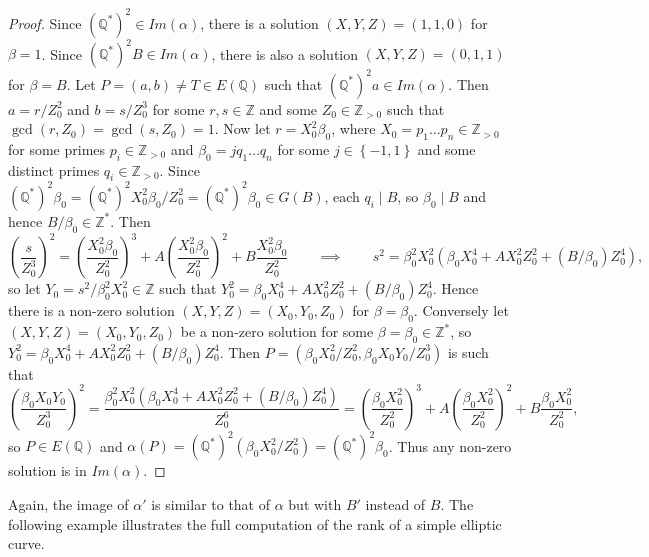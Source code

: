 \documentclass{article}
\newcommand{\Z}{\mathbb{Z}}
\newcommand{\Q}{\mathbb{Q}}
\newcommand{\rb}[1]{\left( #1 \right)}
\newcommand{\cb}[1]{\left\{ #1 \right\}}
\theoremstyle{definition}
\begin{document}
\begin{proof}
Since $ \rb{\Q^*}^2 \in Im\rb{\alpha} $, there is a solution $ \rb{X, Y, Z} = \rb{1, 1, 0} $ for $ \beta = 1 $. Since $ \rb{\Q^*}^2B \in Im\rb{\alpha} $, there is also a solution $ \rb{X, Y, Z} = \rb{0, 1, 1} $ for $ \beta = B $. Let $ P = \rb{a, b} \ne T \in E\rb{\Q} $ such that $ \rb{\Q^*}^2a \in Im\rb{\alpha} $. Then $ a = r / Z_0^2 $ and $ b = s / Z_0^3 $ for some $ r, s \in \Z $ and some $ Z_0 \in \Z_{> 0} $ such that $ \gcd\rb{r, Z_0} = \gcd\rb{s, Z_0} = 1 $. Now let $ r = X_0^2\beta_0 $, where $ X_0 = p_1 \dots p_n \in \Z_{> 0} $ for some primes $ p_i \in \Z_{> 0} $ and $ \beta_0 = j q_1 \dots q_n $ for some $ j \in \cb{-1, 1} $ and some distinct primes $ q_i \in \Z_{> 0} $. Since $ \rb{\Q^*}^2\beta_0 = \rb{\Q^*}^2X_0^2\beta_0 / Z_0^2 = \rb{\Q^*}^2\beta_0 \in G\rb{B} $, each $ q_i \mid B $, so $ \beta_0 \mid B $ and hence $ B / \beta_0 \in \Z^* $. Then
$$ \rb{\dfrac{s}{Z_0^3}}^2 = \rb{\dfrac{X_0^2\beta_0}{Z_0^2}}^3 + A\rb{\dfrac{X_0^2\beta_0}{Z_0^2}}^2 + B\dfrac{X_0^2\beta_0}{Z_0^2} \qquad \implies \qquad s^2 = \beta_0^2X_0^2\rb{\beta_0X_0^4 + AX_0^2Z_0^2 + \rb{B / \beta_0}Z_0^4}, $$
so let $ Y_0 = s^2 / \beta_0^2X_0^2 \in \Z $ such that $ Y_0^2 = \beta_0X_0^4 + AX_0^2Z_0^2 + \rb{B / \beta_0}Z_0^4 $. Hence there is a non-zero solution $ \rb{X, Y, Z} = \rb{X_0, Y_0, Z_0} $ for $ \beta = \beta_0 $. Conversely let $ \rb{X, Y, Z} = \rb{X_0, Y_0, Z_0} $ be a non-zero solution for some $ \beta = \beta_0 \in \Z^* $, so $ Y_0^2 = \beta_0 X_0^4 + AX_0^2Z_0^2 + \rb{B / \beta_0}Z_0^4 $. Then $ P = \rb{\beta_0 X_0^2 / Z_0^2, \beta_0 X_0Y_0 / Z_0^3} $ is such that
$$ \rb{\dfrac{\beta_0 X_0Y_0}{Z_0^3}}^2 = \dfrac{\beta_0^2X_0^2\rb{\beta_0 X_0^4 + AX_0^2Z_0^2 + \rb{B / \beta_0}Z_0^4}}{Z_0^6} = \rb{\dfrac{\beta_0 X_0^2}{Z_0^2}}^3 + A\rb{\dfrac{\beta_0 X_0^2}{Z_0^2}}^2 + B\dfrac{\beta_0 X_0^2}{Z_0^2}, $$
so $ P \in E\rb{\Q} $ and $ \alpha\rb{P} = \rb{\Q^*}^2\rb{\beta_0 X_0^2 / Z_0^2} = \rb{\Q^*}^2\beta_0 $. Thus any non-zero solution is in $ Im\rb{\alpha} $.
\end{proof}

Again, the image of $ \alpha' $ is similar to that of $ \alpha $ but with $ B' $ instead of $ B $. The following example illustrates the full computation of the rank of a simple elliptic curve.
\end{document}
